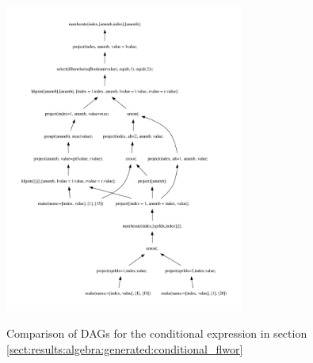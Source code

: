 \begin{figure}[!h]
{{			\includegraphics[width=0.7\textwidth]{img/graphs/td_impl_flwor_ifthenelse_xq_relalg_dag}
			\label{fig:result:comparison:conditional_pathfinder_dag}
		}
	}
	\caption{Comparison of DAGs for the conditional expression in section
	\ref{sect:results:algebra:generated:conditional_flwor}}
\end{figure}


